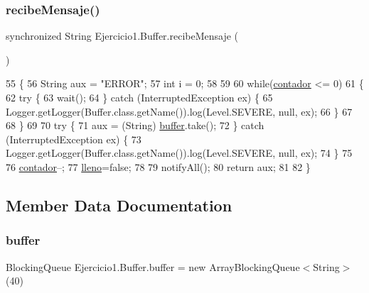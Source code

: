 \subsubsection{\texorpdfstring{recibe\+Mensaje()}{recibeMensaje()}}
{\footnotesize\ttfamily synchronized String Ejercicio1.\+Buffer.\+recibe\+Mensaje (\begin{DoxyParamCaption}{ }\end{DoxyParamCaption})\hspace{0.3cm}{\ttfamily [inline]}}


\begin{DoxyCode}
55     \{
56         String aux = \textcolor{stringliteral}{"ERROR"};
57         \textcolor{keywordtype}{int} i = 0;
58         
59         
60         \textcolor{keywordflow}{while}(\mbox{\hyperlink{class_ejercicio1_1_1_buffer_a2d253914c2d2e673971f0486f0499e82}{contador}} <= 0)
61         \{
62             \textcolor{keywordflow}{try} \{
63                 wait();
64             \} \textcolor{keywordflow}{catch} (InterruptedException ex) \{
65                 Logger.getLogger(Buffer.class.getName()).log(Level.SEVERE, null, ex);
66             \}
67             
68         \}
69         
70         \textcolor{keywordflow}{try} \{
71             aux = (String) \mbox{\hyperlink{class_ejercicio1_1_1_buffer_a8aac505cb8d56d8242ef65e0701079bf}{buffer}}.take();
72         \} \textcolor{keywordflow}{catch} (InterruptedException ex) \{
73             Logger.getLogger(Buffer.class.getName()).log(Level.SEVERE, null, ex);
74         \}
75         
76         \mbox{\hyperlink{class_ejercicio1_1_1_buffer_a2d253914c2d2e673971f0486f0499e82}{contador}}--;
77         \mbox{\hyperlink{class_ejercicio1_1_1_buffer_ac31a3784041537125eb245e82a5dcc8f}{lleno}}=\textcolor{keyword}{false};
78         
79         notifyAll();
80         \textcolor{keywordflow}{return} aux;
81         
82     \}
\end{DoxyCode}


\subsection{Member Data Documentation}
\mbox{\label{class_ejercicio1_1_1_buffer_a8aac505cb8d56d8242ef65e0701079bf}} 
\subsubsection{\texorpdfstring{buffer}{buffer}}
{\footnotesize\ttfamily Blocking\+Queue Ejercicio1.\+Buffer.\+buffer = new Array\+Blocking\+Queue$<$String$>$(40)\hspace{0.3cm}{\ttfamily [private]}}


